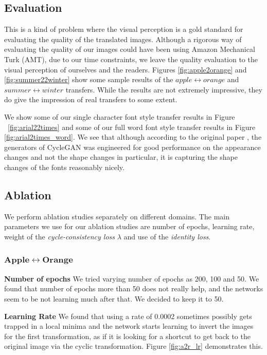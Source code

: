 \documentclass[10pt,twocolumn,letterpaper]{article}
\begin{document}
\subsection{Evaluation}
This is a kind of problem where the visual perception is a gold standard for
evaluating the quality of the translated images. Although a rigorous way of evaluating the quality of our images could have been using 
Amazon Mechanical Turk (AMT), due to our time constraints, we leave the quality
evaluation to the visual perception of ourselves and the readers. Figures 
\ref{fig:apple2orange} and \ref{fig:summer22winter} show some sample results of 
the $apple \leftrightarrow orange$ and $summer \leftrightarrow winter$ transfers. While 
the results are not extremely impressive, they do give the impression of real transfers to some extent.

We show some of our single character font style transfer results in Figure \
\ref{fig:arial22times} and some of our full word font style transfer results in
Figure \ref{fig:arial2times_word}. We see that although according to the original paper 
\cite{cyclegan}, the generators of CycleGAN was engineered for good performance on the appearance changes and not the shape changes in particular, it is capturing the shape changes of the fonts reasonably nicely. 

\subsection{Ablation}
We perform ablation studies separately on different domains. The main parameters we use for our ablation studies are number of epochs, learning rate, weight of the \textit{cycle-consistency loss} $\lambda$ and use of the \textit{identity loss}.

\subsubsection{$\mathbf{Apple \leftrightarrow Orange}$}
\noindent\textbf{Number of epochs} We tried varying number of epochs as 200, 100 and 50. We found that number of epochs more than 
50 does not really help, and the networks seem to be not learning much after that. We decided to keep it to 50. 

\noindent\textbf{Learning Rate} We found that using a rate of 0.0002 sometimes possibly gets trapped in a local minima and the network starts learning to invert the images for the first transformation, as if it is looking for a shortcut to get back to the original image via the cyclic transformation. Figure \ref{fig:a2r_lr} demonstrates this.
\end{document}
